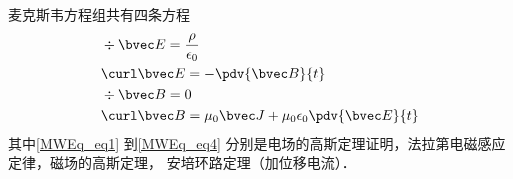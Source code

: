 
\begin{issues}
\issueDraft
\end{issues}

麦克斯韦方程组共有四条方程
\begin{align}
\label{MWEq_eq1}
&\div \bvec E = \frac{\rho}{\epsilon_0}\\
\label{MWEq_eq2}
&\curl \bvec E = -\pdv{\bvec B}{t}\\
\label{MWEq_eq3}
&\div \bvec B = 0 \\
\label{MWEq_eq4}
&\curl \bvec B = \mu_0 \bvec J + \mu_0\epsilon_0 \pdv{\bvec E}{t}
\end{align}
其中\autoref{MWEq_eq1} 到\autoref{MWEq_eq4} 分别是电场的高斯定理证明，法拉第电磁感应定律，磁场的高斯定理， 安培环路定理（加位移电流）．%
